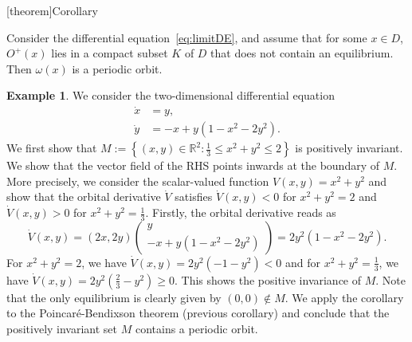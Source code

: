 \documentclass[12pt]{report}
\theoremstyle{definition}
\begin{document}
[theorem]{Corollary}
\begin{existence of a periodic orbit}
    Consider the differential equation~\eqref{eq:limitDE},
    and assume that for some $x\in D$, $O^+(x)$ lies in a compact subset $K$ of
    $D$ that does not contain an equilibrium. 
    Then $\omega(x)$ is a periodic orbit.
\end{existence of a periodic orbit}

\newtheorem{existence of orbit}[theorem]{Example}
\begin{existence of orbit}
    We consider the two-dimensional differential equation
    \begin{align*}
        \dot{x} & = y, \\
        \dot{y} & = -x+y(1-x^{2}-2y^{2}).
    \end{align*} 
    We first show that $M:=\left\{(x,y)\in\mathbb{R}^{2}:\frac{1}{3}\le
    x^{2}+y^{2}\le 2\right\}$ is positively invariant.
    We show that the vector field of the RHS points inwards at the boundary of
    $M$. More precisely, we consider the scalar-valued function
    $V(x,y)=x^{2}+y^{2}$ and show that the orbital derivative $\dot{V}$
    satisfies $\dot{V}(x,y)<0$ for $x^{2}+y^{2}=2$ and $\dot{V}(x,y)>0$ for
    $x^{2}+y^{2}=\frac{1}{3}$.
    Firstly, the orbital derivative reads as
    \[
        \dot{V}(x,y)=(2x, 2y)\begin{pmatrix}
                y\\
                -x+y(1-x^{2}-2y^{2})
            \end{pmatrix} =2y^{2}(1-x^{2}-2y^{2}).
    \]
    For $x^{2}+y^{2}=2$, we have $\dot{V}(x,y)=2y^{2}(-1-y^{2})<0$
    and for $x^{2}+y^{2}=\frac{1}{3}$, we have
    $\dot{V}(x,y)=2y^{2}(\frac{2}{3}-y^{2})\ge 0$.
    This shows the positive invariance of $M$.
    Note that the only equilibrium is clearly given by $(0,0)\notin M$.
    We apply the corollary to the Poincar\'{e}-Bendixson theorem (previous
    corollary) and conclude that the positively invariant set $M$ contains a
    periodic orbit.
\end{existence of orbit}
\end{document}
